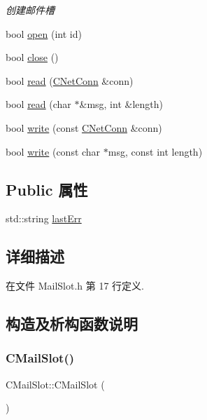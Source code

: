 \begin{DoxyCompactItemize}
\begin{DoxyCompactList}\small\item\em 创建邮件槽 \end{DoxyCompactList}\item 
bool \hyperlink{class_c_mail_slot_a23a09f6261450e62570ee1314c62eb97}{open} (int id)
\item 
bool \hyperlink{class_c_mail_slot_afc370072c2ab921ba66c55d1509262ad}{close} ()
\item 
bool \hyperlink{class_c_mail_slot_a8eb1b3b7bd937365ca865d76e25a4941}{read} (\hyperlink{class_c_net_conn}{C\+Net\+Conn} \&conn)
\item 
bool \hyperlink{class_c_mail_slot_a17b53bd1601b38ba99bac0dda7ac0794}{read} (char $\ast$\&msg, int \&length)
\item 
bool \hyperlink{class_c_mail_slot_a5eb6d0ece129a9c023cd058f45653427}{write} (const \hyperlink{class_c_net_conn}{C\+Net\+Conn} \&conn)
\item 
bool \hyperlink{class_c_mail_slot_add3c2a84d9d2e588f23e009c08c0ca2d}{write} (const char $\ast$msg, const int length)
\end{DoxyCompactItemize}
\subsection*{Public 属性}
\begin{DoxyCompactItemize}
\item 
std\+::string \hyperlink{class_c_mail_slot_a4e3521651dae10b64456ad61b2612009}{last\+Err}
\end{DoxyCompactItemize}


\subsection{详细描述}


在文件 Mail\+Slot.\+h 第 17 行定义.



\subsection{构造及析构函数说明}
\mbox{\label{class_c_mail_slot_a78c844efb3e2d5e481fea0ef4e2bcbc5}} 
\subsubsection{\texorpdfstring{C\+Mail\+Slot()}{CMailSlot()}\hspace{0.1cm}{\footnotesize\ttfamily [1/2]}}
{\footnotesize\ttfamily C\+Mail\+Slot\+::\+C\+Mail\+Slot (\begin{DoxyParamCaption}{ }\end{DoxyParamCaption})}




